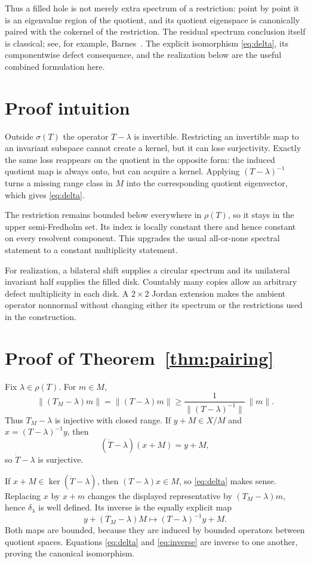 \documentclass[11pt]{article}
\begin{document}
Thus a filled hole is not merely extra spectrum of a restriction: point by
point it is an eigenvalue region of the quotient, and its quotient eigenspace
is canonically paired with the cokernel of the restriction.  The residual
spectrum conclusion itself is classical; see, for example,
Barnes~\cite[Results 1]{barnes}.  The explicit isomorphism
\eqref{eq:delta}, its componentwise defect consequence, and the realization
below are the useful combined formulation here.

\section{Proof intuition}

Outside $\sigma(T)$ the operator $T-\lambda$ is invertible.  Restricting an
invertible map to an invariant subspace cannot create a kernel, but it can
lose surjectivity.  Exactly the same loss reappears on the quotient in the
opposite form: the induced quotient map is always onto, but can acquire a
kernel.  Applying $(T-\lambda)^{-1}$ turns a missing range class in $M$ into
the corresponding quotient eigenvector, which gives \eqref{eq:delta}.

The restriction remains bounded below everywhere in $\rho(T)$, so it stays
in the upper semi-Fredholm set.  Its index is locally constant there and hence
constant on every resolvent component.  This upgrades the usual all-or-none
spectral statement to a constant multiplicity statement.

For realization, a bilateral shift supplies a circular spectrum and its
unilateral invariant half supplies the filled disk.  Countably many copies
allow an arbitrary defect multiplicity in each disk.  A $2\times2$ Jordan
extension makes the ambient operator nonnormal without changing either its
spectrum or the restrictions used in the construction.

\section{Proof of Theorem~\ref{thm:pairing}}

Fix $\lambda\in\rho(T)$.  For $m\in M$,
\[
 \|(T_M-\lambda)m\|=\|(T-\lambda)m\|
 \ge \frac{1}{\|(T-\lambda)^{-1}\|}\,\|m\|.
\]
Thus $T_M-\lambda$ is injective with closed range.  If $y+M\in X/M$ and
$x=(T-\lambda)^{-1}y$, then
\[
 (\dot T-\lambda)(x+M)=y+M,
\]
so $\dot T-\lambda$ is surjective.

If $x+M\in\ker(\dot T-\lambda)$, then $(T-\lambda)x\in M$, so
\eqref{eq:delta} makes sense.  Replacing $x$ by $x+m$ changes the displayed
representative by $(T_M-\lambda)m$, hence $\delta_\lambda$ is well defined.
Its inverse is the equally explicit map
\begin{equation}\label{eq:inverse}
 y+(T_M-\lambda)M\longmapsto (T-\lambda)^{-1}y+M.
\end{equation}
Both maps are bounded, because they are induced by bounded operators between
quotient spaces.  Equations \eqref{eq:delta} and \eqref{eq:inverse} are inverse
to one another, proving the canonical isomorphism.
\end{document}
